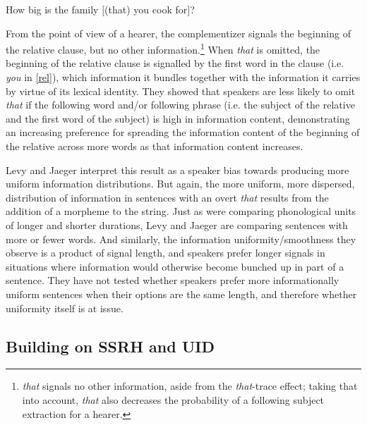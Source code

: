 \documentclass[12pt]{article}
\begin{document}
\begin{exe}
\ex \label{rel} How big is the family $[$(that) you cook for$]$?
\end{exe}

\noindent From the point of view of a hearer, the complementizer signals the beginning of the relative clause, but no other information.\footnote{\textsl{that} signals no other information, aside from the \textsl{that}-trace effect; taking that into account, \textsl{that} also decreases the probability of a following subject extraction for a hearer.} When \textsl{that} is omitted, the beginning of the relative clause is signalled by the first word in the clause (i.e. \textsl{you} in \ref{rel}), which information it bundles together with the information it carries by virtue of its lexical identity. They showed that speakers are less likely to omit \textsl{that} if the following word and/or following phrase (i.e. the subject of the relative and the first word of the subject) is high in information content, demonstrating an increasing preference for spreading the information content of the beginning of the relative across more words as that information content increases.

Levy and Jaeger interpret this result as a speaker bias towards producing more uniform information distributions. But again, the more uniform, more dispersed, distribution of information in sentences with an overt \textsl{that} results from the addition of a morpheme to the string. Just as \citet{aylettturk2004} were comparing phonological units of longer and shorter durations, Levy and Jaeger are comparing sentences with more or fewer words. And similarly, the information uniformity/smoothness they observe is a product of signal length, and speakers prefer longer signals in situations where information would otherwise become bunched up in part of a sentence. They have not tested whether speakers prefer more informationally uniform sentences when their options are the same length, and therefore whether uniformity itself is at issue.


\subsection{Building on SSRH and UID}
\end{document}
